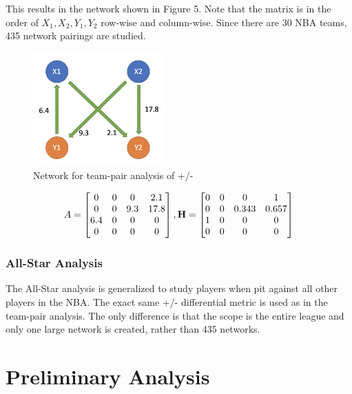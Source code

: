 \documentclass[12pt]{article}%
\begin{document}
This results in the network shown in Figure 5. Note that the matrix is in the order of $X_1,X_2,Y_1,Y_2$ row-wise and column-wise. Since there are 30 NBA teams, 435 network pairings are studied.
  \begin{figure}[H]
	\centering
	\includegraphics[width=2in]{./images/team.png}
	\caption[Network for team-pair analysis of +/-]{Network for team-pair analysis of +/-}
\end{figure}
\begin{align*}
A =\begin{bmatrix}0 & 0 & 0 & 2.1 \\0 & 0 & 9.3 & 17.8\\ 6.4 &0&0&0\\0&0&0&0\end{bmatrix}, \textbf H=\begin{bmatrix}0 & 0 & 0 & 1 \\0 & 0 & 0.343 & 0.657\\ 1 &0&0&0\\0&0&0&0\end{bmatrix}
\end{align*}
\subsubsection{All-Star Analysis}
\label{sec:2.3}
\null\quad\quad The All-Star analysis is generalized to study players when pit against all other players in the NBA. The exact same +/- differential metric is used as in the team-pair analysis. The only difference is that the scope is the entire league and only one large network is created, rather than 435 networks.
\section{Preliminary Analysis}
\end{document}
